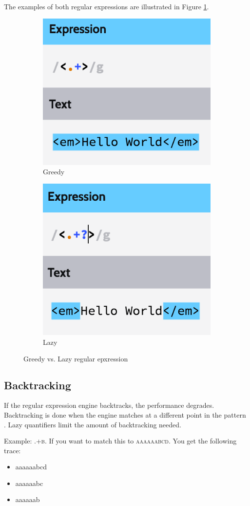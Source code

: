 \documentclass[11pt]{article}
\begin{document}
The examples of both regular expressions are illustrated in Figure \ref{fig:regexes}.

\begin{figure}[b]
  \centering
  \begin{subfigure}{.5\textwidth}
    \centering
    \includegraphics[width=.4\linewidth]{expr1}
    \caption{Greedy}
  \end{subfigure}%
  \begin{subfigure}{.5\textwidth}
    \centering
    \includegraphics[width=.4\linewidth]{expr2}
    \caption{Lazy}
  \end{subfigure}
  \caption{Greedy vs. Lazy regular epxression \cite{regexr}}
  \label{fig:regexes}
\end{figure}

\subsection{Backtracking}
If the regular expression engine backtracks, the performance degrades. Backtracking is done when the engine matches at a different point in the pattern \cite{why-use}. Lazy quantifiers limit the amount of backtracking needed.

Example: \textsc{.+b}. If you want to match this to \textsc{aaaaaabcd}. You get the following trace:

\begin{itemize}
  \item aaaaaabcd
  \item aaaaaabc
  \item aaaaaab
\end{itemize}
\end{document}
